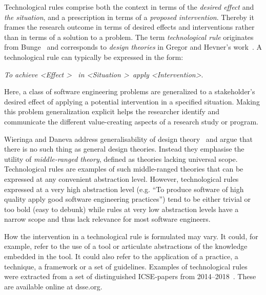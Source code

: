 \documentclass[graybox]{svmult}
\begin{document}
Technological rules comprise both the context in terms of the \emph{desired effect} and \emph{the situation}, and a prescription in terms of a \emph{proposed intervention}. Thereby it frames the research outcome in terms of desired effects and interventions rather than in terms of a solution to a problem. The term \emph{technological rule} originates from Bunge~\cite{bunge_philosophy_1998} and corresponds to \emph{design theories} in Gregor and Hevner's work~\cite{gregor_positioning_2013}. %
A technological rule can typically be expressed in the form: 

\begin{center}{\emph{To achieve \textless Effect \textgreater ~ in \textless Situation \textgreater~apply \textless Intervention\textgreater}.} 
\end{center}

Here, a class of software engineering problems are generalized to a stakeholder's desired effect of applying a potential intervention in a specified situation. 
Making this problem generalization explicit helps the researcher identify and communicate the different value-creating aspects of a research study or program.



Wieringa and Daneva address generalisability of design theory~\cite{wieringa_six_2015} and argue that there is no such thing as general design theories. Instead they emphasise the utility of \emph{middle-ranged theory}, defined as theories lacking universal scope. 
Technological rules are examples of such middle-ranged theories that can be expressed at any convenient abstraction level. However, technological rules expressed at a very high abstraction level (e.g. ``To produce software of high quality apply good software engineering practices'') tend to be either trivial or too bold (easy to debunk) while rules at very low abstraction levels have a narrow scope and thus lack relevance for most software engineers. 

How the intervention in a technological rule is formulated may vary. It could, for example, refer to the use of a tool or articulate abstractions of the knowledge embedded in the tool. It could also refer to the application of a practice, a technique, a framework or a set of guidelines. Examples of technological rules were extracted from a set of distinguished ICSE-papers from 2014--2018~\cite{Engstrom19arxiv}. These are available online at dsse.org.
\end{document}
